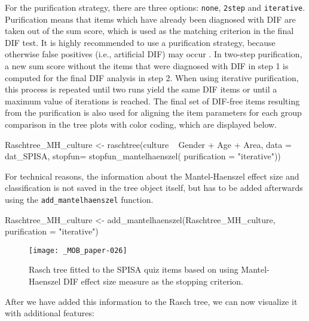 \documentclass[doc,floatsintext,natbib]{apa7}
\begin{document}
For the purification strategy, there are three options: \texttt{none}, \texttt{2step} and \texttt{iterative}. Purification means that items which have already been diagnosed with DIF are taken out of the sum score, which is used as the matching criterion in the final DIF test. It is highly recommended to use a purification strategy, because otherwise false positives (i.e., artificial DIF) may occur \citep[cf., e.g.,][and the references therein]{DebStrZei:2022:CRC,HennyDeba23,Kopfetal:2015:EPM}. In two-step purification, a new sum score without the items that were diagnosed with DIF in step 1 is computed for the final DIF analysis in step 2. When using iterative purification, this process is repeated until two runs yield the same DIF items or until a maximum value of iterations is reached. 
The final set of DIF-free items resulting from the purification is also used for aligning the item parameters for each group comparison in the tree plots with color coding, which are displayed below.


\begin{Schunk}
\begin{Sinput}
 Raschtree_MH_culture <- raschtree(culture ~  Gender + Age + Area,
                                   data = dat_SPISA,
                                   stopfun= stopfun_mantelhaenszel(
                                     purification = "iterative"))
\end{Sinput}
\end{Schunk}

For technical reasons, the information about the Mantel-Haenszel effect size and classification is not saved in the tree object itself, but has to be added afterwards using the \texttt{add\_mantelhaenszel} function.

\begin{Schunk}
\begin{Sinput}
 Raschtree_MH_culture <- add_mantelhaenszel(Raschtree_MH_culture,
                                            purification = "iterative")
\end{Sinput}
\end{Schunk}



\begin{figure}%
\caption{Rasch tree fitted to the SPISA quiz items based on using Mantel-Haenszel DIF effect size measure as the stopping criterion.}
\texttt{[image: \_MOB\_paper-026]}
\label{fig:MHtree2}
\end{figure}%

After we have added this information to the Rasch tree, we can now visualize it with additional features: 
\end{document}

